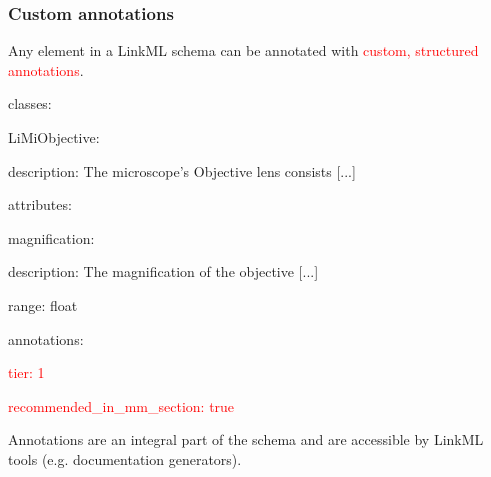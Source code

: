 \begin{frame}
  \frametitle{Custom annotations}

  Any element in a LinkML schema can be annotated with \textcolor<2>{red}{custom,
  structured annotations}.

\begin{semiverbatim}
classes:

\hspace{1em}LiMiObjective:

\hspace{2em}description: The microscope's Objective lens consists [...]

\hspace{2em}attributes:

\hspace{3em}magnification:

\hspace{4em}description: The magnification of the objective [...]

\hspace{4em}range: float

\hspace{4em}annotations:

\hspace{5em}\textcolor<2>{red}{tier: 1}

\hspace{5em}\textcolor<2>{red}{recommended\_in\_mm\_section: true}
\end{semiverbatim}

  Annotations are an integral part of the schema and are
  accessible by LinkML tools (e.g. documentation generators).

\end{frame}

